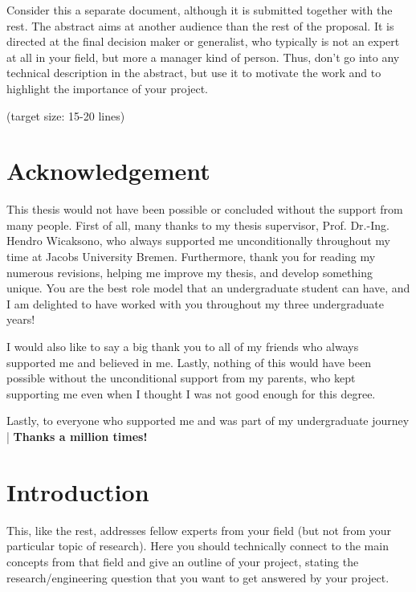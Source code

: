\documentclass[a4paper,11pt,oneside]{article}
\begin{document}
  Consider this a separate document, although it is submitted together
  with the rest. The abstract aims at another audience than the rest
  of the proposal. It is directed at the final decision maker or
  generalist, who typically is not an expert at all in your field, but
  more a manager kind of person. Thus, don't go into any technical
  description in the abstract, but use it to motivate the work and to
  highlight the importance of your project.

  (target size: 15-20 lines)

 \newpage
\section*{Acknowledgement}

  This thesis would not have been possible or concluded without the support from many people. First of all, many thanks to my thesis supervisor, Prof. Dr.-Ing. Hendro Wicaksono, who always supported me unconditionally throughout my time at Jacobs University Bremen. Furthermore, thank you for reading my numerous revisions, helping me improve my thesis, and develop something unique. You are the best role model that an undergraduate student can have, and I am delighted to have worked with you throughout my three undergraduate years! \par

I would also like to say a big thank you to all of my friends who always supported me and believed in me. Lastly, nothing of this would have been possible without the unconditional support from my parents, who kept supporting me even when I thought I was not good enough for this degree. \par

Lastly, to everyone who supported me and was part of my undergraduate journey | \textbf{Thanks a million times!} \par


  \newpage
  \tableofcontents

  \clearpage

  \section{Introduction}

  This, like the rest, addresses fellow experts from your field (but
  not from your particular topic of research). Here you should
  technically connect to the main concepts from that field and give an
  outline of your project, stating the research/engineering question
  that you want to get answered by your project.
\end{document}
